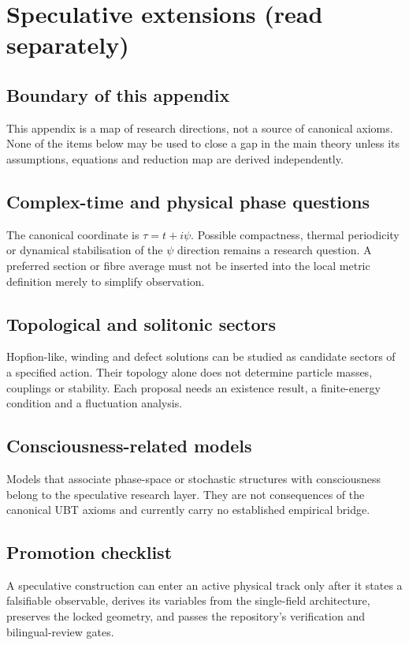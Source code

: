 
\chapter{Speculative extensions (read separately)}

\section{Boundary of this appendix}
This appendix is a map of research directions, not a source of canonical
axioms. None of the items below may be used to close a gap in the main theory
unless its assumptions, equations and reduction map are derived independently.

\section{Complex-time and physical phase questions}
The canonical coordinate is $\tau=t+i\psi$. Possible compactness, thermal
periodicity or dynamical stabilisation of the $\psi$ direction remains a
research question. A preferred section or fibre average must not be inserted
into the local metric definition merely to simplify observation.

\section{Topological and solitonic sectors}
Hopfion-like, winding and defect solutions can be studied as candidate sectors
of a specified action. Their topology alone does not determine particle
masses, couplings or stability. Each proposal needs an existence result, a
finite-energy condition and a fluctuation analysis.

\section{Consciousness-related models}
Models that associate phase-space or stochastic structures with consciousness
belong to the speculative research layer. They are not consequences of the
canonical UBT axioms and currently carry no established empirical bridge.

\section{Promotion checklist}
A speculative construction can enter an active physical track only after it
states a falsifiable observable, derives its variables from the single-field
architecture, preserves the locked geometry, and passes the repository's
verification and bilingual-review gates.
